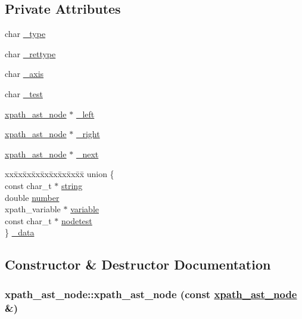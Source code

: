 \subsection*{Private Attributes}
\begin{CompactItemize}
\item 
char \hyperlink{classxpath__ast__node_d285f423090a0aaee3c4126da65066d1}{\_\-type}
\item 
char \hyperlink{classxpath__ast__node_b84a640f3a0f00d4d611d8cdd1f5c029}{\_\-rettype}
\item 
char \hyperlink{classxpath__ast__node_97b21db6df156c37ef7f2e6f69478b77}{\_\-axis}
\item 
char \hyperlink{classxpath__ast__node_421f6ed5f666ced9d6fe3692e84d7b89}{\_\-test}
\item 
\hyperlink{classxpath__ast__node}{xpath\_\-ast\_\-node} $\ast$ \hyperlink{classxpath__ast__node_d229146ced94be21eb5e4921b43a7ebb}{\_\-left}
\item 
\hyperlink{classxpath__ast__node}{xpath\_\-ast\_\-node} $\ast$ \hyperlink{classxpath__ast__node_b3935ea7e83f4421b20840cd84f0b37d}{\_\-right}
\item 
\hyperlink{classxpath__ast__node}{xpath\_\-ast\_\-node} $\ast$ \hyperlink{classxpath__ast__node_10059a66ecff3384e175e00d9fa2afcd}{\_\-next}
\item 
\begin{tabbing}
xx\=xx\=xx\=xx\=xx\=xx\=xx\=xx\=xx\=\kill
union \{\\
\>const char\_t $\ast$ \hyperlink{classxpath__ast__node_187822d65799b3bbccd8d0522bd14e59}{string}\\
\>double \hyperlink{classxpath__ast__node_73870c7a83538e525398855b26154484}{number}\\
\>xpath\_variable $\ast$ \hyperlink{classxpath__ast__node_0fd3b0d8f930836105eeff6e2efa5ad3}{variable}\\
\>const char\_t $\ast$ \hyperlink{classxpath__ast__node_50f44079b7f3e399e23488f520a34f17}{nodetest}\\
\} \hyperlink{classxpath__ast__node_4a44839b652d66262d384347c529c7c0}{\_data}\\

\end{tabbing}\end{CompactItemize}


\subsection{Constructor \& Destructor Documentation}
\hypertarget{classxpath__ast__node_e5a059e41b41505bef1f7dbebda8070b}{
\subsubsection[xpath\_\-ast\_\-node]{\setlength{\rightskip}{0pt plus 5cm}xpath\_\-ast\_\-node::xpath\_\-ast\_\-node (const \hyperlink{classxpath__ast__node}{xpath\_\-ast\_\-node} \&)}}
\label{classxpath__ast__node_e5a059e41b41505bef1f7dbebda8070b}


